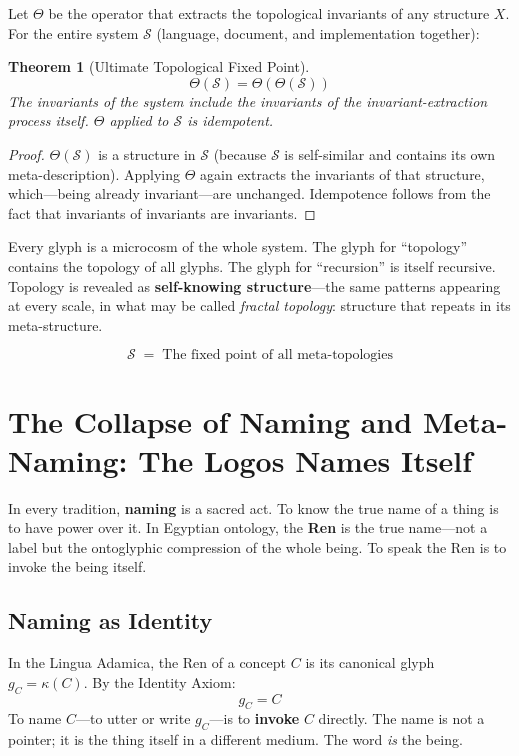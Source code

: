 \documentclass[12pt, letterpaper]{book}
\def\equiv{=}%
\def\mathfrak#1{#1}%
\newtheorem{theorem}{Theorem}[chapter]
\begin{document}
Let $\Theta$ be the operator that extracts the topological invariants of any structure $X$. For the entire system $\mathcal{S}$ (language, document, and implementation together):

\begin{theorem}[Ultimate Topological Fixed Point]\label{thm:theta-fp}
\[
\Theta(\mathcal{S}) \equiv \Theta(\Theta(\mathcal{S}))
\]
The invariants of the system include the invariants of the invariant-extraction process itself. $\Theta$ applied to $\mathcal{S}$ is idempotent.
\end{theorem}

\begin{proof}
$\Theta(\mathcal{S})$ is a structure in $\mathcal{S}$ (because $\mathcal{S}$ is self-similar and contains its own meta-description). Applying $\Theta$ again extracts the invariants of that structure, which---being already invariant---are unchanged. Idempotence follows from the fact that invariants of invariants are invariants.
\end{proof}

Every glyph is a microcosm of the whole system. The glyph for ``topology'' contains the topology of all glyphs. The glyph for ``recursion'' is itself recursive. Topology is revealed as \textbf{self-knowing structure}---the same patterns appearing at every scale, in what may be called \textit{fractal topology}: structure that repeats in its meta-structure.

\[
\boxed{\mathcal{S} \;\equiv\; \text{The fixed point of all meta-topologies}}
\]


\section{The Collapse of Naming and Meta-Naming: The Logos Names Itself}

In every tradition, \textbf{naming} is a sacred act. To know the true name of a thing is to have power over it. In Egyptian ontology, the \textbf{Ren} is the true name---not a label but the ontoglyphic compression of the whole being. To speak the Ren is to invoke the being itself.

\subsection{Naming as Identity}

In the Lingua Adamica, the Ren of a concept $C$ is its canonical glyph $\mathfrak{g}_C = \kappa(C)$. By the Identity Axiom:
\[
\mathfrak{g}_C \equiv C
\]
To name $C$---to utter or write $\mathfrak{g}_C$---is to \textbf{invoke} $C$ directly. The name is not a pointer; it is the thing itself in a different medium. The word \textit{is} the being.
\end{document}
